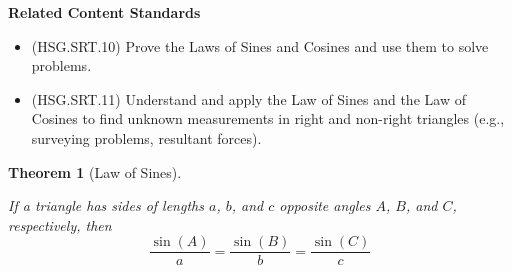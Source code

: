 \documentclass[
]{book}
\providecommand{\tightlist}{%
  \setlength{\itemsep}{0pt}\setlength{\parskip}{0pt}}
\newenvironment{standards}{}{}
\newtheorem{theorem}{Theorem}[chapter]
\theoremstyle{definition}
\theoremstyle{definition}
\theoremstyle{definition}
\theoremstyle{definition}
\theoremstyle{remark}
\begin{document}
\begin{standards}

\begin{center}
\textbf{Related Content Standards}

\end{center}

\begin{itemize}
\tightlist
\item
  (HSG.SRT.10) Prove the Laws of Sines and Cosines and use them to solve problems.
\item
  (HSG.SRT.11) Understand and apply the Law of Sines and the Law of Cosines to find unknown measurements in right and non-right triangles (e.g., surveying problems, resultant forces).
\end{itemize}

\end{standards}

\begin{theorem}[Law of Sines]
\protect\hypertarget{thm:unlabeled-div-137}{}\label{thm:unlabeled-div-137}

If a triangle has sides of lengths \(a\), \(b\), and \(c\) opposite angles \(A\), \(B\), and \(C\), respectively, then
\[\frac{\sin(A)}{a}=\frac{\sin(B)}{b} = \frac{\sin(C)}{c}\]

\end{theorem}
\end{document}
